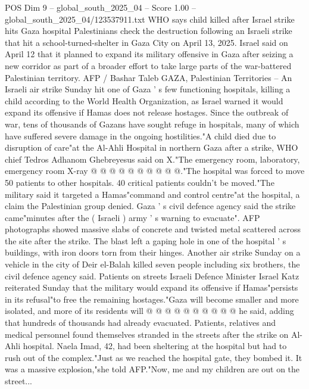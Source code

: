 \begin{textsample}{POS Dim 9 – global\_south\_2025\_04 – Score 1.00 – global\_south\_2025\_04/123537911.txt}  \label{ex:f9_pos_151}
WHO says child killed after Israel strike hits Gaza hospital Palestinians check the destruction following an Israeli strike that hit a school-turned-shelter in Gaza City on April 13, 2025.
Israel said on April 12 that it planned to expand its military offensive in Gaza after seizing a new corridor as part of a broader effort to take large parts of the war-battered Palestinian territory.
AFP / Bashar Taleb GAZA, Palestinian Territories -- An Israeli air strike Sunday hit one of Gaza ' s few functioning hospitals, killing a child according to the World Health Organization, as Israel warned it would expand its offensive if Hamas does not release hostages.
Since the outbreak of war, tens of thousands of Gazans have sought refuge in hospitals, many of which have suffered severe damage in the ongoing hostilities."A child died due to disruption of care"at the Al-Ahli Hospital in northern Gaza after a strike, WHO chief Tedros Adhanom Ghebreyesus said on X."The emergency room, laboratory, emergency room X-ray @ @ @ @ @ @ @ @ @ @."The hospital was forced to move 50 patients to other hospitals. 40 critical patients couldn't be moved."The military said it targeted a Hamas"command and control centre"at the hospital, a claim the Palestinian group denied.
Gaza ' s civil defence agency said the strike came"minutes after the ( Israeli ) army ' s warning to evacuate".
AFP photographs showed massive slabs of concrete and twisted metal scattered across the site after the strike.
The blast left a gaping hole in one of the hospital ' s buildings, with iron doors torn from their hinges.
Another air strike Sunday on a vehicle in the city of Deir el-Balah killed seven people including six brothers, the civil defence agency said.
Patients on streets Israeli Defence Minister Israel Katz reiterated Sunday that the military would expand its offensive if Hamas"persists in its refusal"to free the remaining hostages."Gaza will become smaller and more isolated, and more of its residents will @ @ @ @ @ @ @ @ @ @ he said, adding that hundreds of thousands had already evacuated.
Patients, relatives and medical personnel found themselves stranded in the streets after the strike on Al-Ahli hospital.
Naela Imad, 42, had been sheltering at the hospital but had to rush out of the complex."Just as we reached the hospital gate, they bombed it.
It was a massive explosion,"she told AFP."Now, me and my children are out on the street...

\end{textsample}
